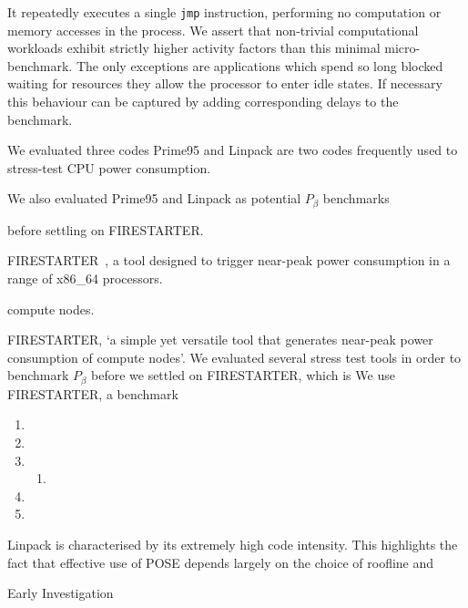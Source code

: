 It repeatedly executes a single \texttt{jmp} instruction, performing no computation or memory accesses in the process.
We assert that non-trivial computational workloads exhibit strictly higher activity factors than this minimal micro-benchmark.
The only exceptions are applications which spend so long blocked waiting for resources they allow the processor to enter idle states.
If necessary this behaviour can be captured by adding corresponding delays to the benchmark.

We evaluated three codes
Prime95 and Linpack are two codes frequently used to stress-test CPU power consumption.

We also evaluated Prime95 and Linpack as potential $P_{\beta}$ benchmarks


before settling on FIRESTARTER.

FIRESTARTER~\cite{hackenberg:2013ab}, a tool designed to trigger near-peak power consumption in a range of x86\_64 processors.

compute nodes.

FIRESTARTER, `a simple yet versatile tool that generates near-peak power consumption of compute nodes'.
We evaluated several stress test tools in order to benchmark $P_{\beta}$ before we settled on
FIRESTARTER, which is
We use FIRESTARTER, a benchmark

\begin{enumerate}
  \item {}
  \item {}
  \item {}
  \begin{enumerate}
    \item {}
  \end{enumerate}
  \item {}
  \item {}
\end{enumerate}



Linpack is characterised by its extremely high code intensity.
This highlights the fact that effective use of POSE depends largely on the choice of roofline and


\begin{table}
\centering
\caption{Early Investigation}

\end{table}



